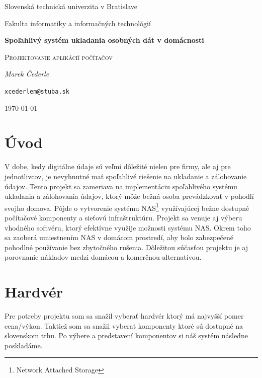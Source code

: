 \documentclass[12pt,oneside,slovak,a4paper]{article}
\begin{document}
\linespread{1.5}\selectfont

\begin{titlepage}
	\centering
    {\Large Slovenská technická univerzita v Bratislave\par}
    {\Large Fakulta informatiky a informačných technológií\par}
	\vspace{7cm}
	{\huge\bfseries Spoľahlivý systém ukladania osobných dát v domácnosti\par}
	\vspace{0.5cm}
    {\Large \textsc{Projektovanie aplikácií počítačov}\par}
    \vspace{1cm}
	{\Large\itshape Marek Čederle\par}
    {\small\texttt{xcederlem@stuba.sk}\par}
	\vfill

	{\large \today\par}
\end{titlepage}


\tableofcontents
\vspace*{\fill}
\newpage


\nocite{*}

\section{Úvod}
V dobe, kedy digitálne údaje sú veľmi dôležité nielen pre firmy, ale aj pre jednotlivcov, je nevyhnutné mať spoľahlivé riešenie na ukladanie a zálohovanie údajov. Tento projekt sa zameriava na implementáciu spoľahlivého systému ukladania a zálohovania údajov, ktorý môže bežná osoba prevádzkovať v pohodlí svojho domova. Pôjde o vytvorenie systému NAS\footnote{Network Attached Storage} využívajúcej bežne dostupné počítačové komponenty a sieťovú infraštruktúru. Projekt sa venuje aj výberu vhodného softvéru, ktorý efektívne využije možnosti systému NAS. Okrem toho sa zaoberá umiestnením NAS v domácom prostredí, aby bolo zabezpečené pohodlné používanie bez zbytočného rušenia. Dôležitou súčasťou projektu je aj porovnanie nákladov medzi domácou a komerčnou alternatívou.

\section{Hardvér}
Pre potreby projektu som sa snažil vyberať hardvér ktorý má najvyšší pomer cena/výkon. Taktiež som sa snažil vyberať komponenty ktoré sú dostupné na slovenskom trhu. Po výbere a predstavení komponentov si náš systém následne poskladáme.
\end{document}
